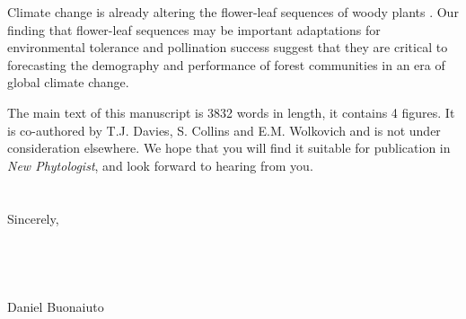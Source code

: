 \documentclass{article}[12pt]
\begin{document}
\noindent Climate change is already altering the flower-leaf sequences of woody plants \citep{Ma:2021tf,Wang:2022wt}. Our finding that flower-leaf sequences may be important adaptations for environmental tolerance and pollination success suggest that they are critical to forecasting the demography and performance of forest communities in an era of global climate change.


\noindent The main text of this manuscript is 3832 words in length, it contains 4 figures. It is co-authored by T.J. Davies, S. Collins and E.M. Wolkovich and is not under consideration elsewhere. We hope that you will find it suitable for publication in \textit{New Phytologist}, and look forward to hearing from you.\\\\
\\Sincerely,\\\\\\\\\\

\noindent Daniel Buonaiuto\\

\pagebreak


 
\end{document}
